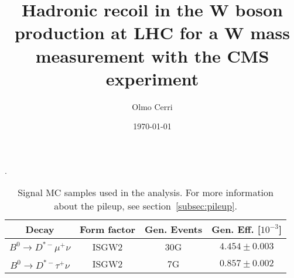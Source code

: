 \documentclass[a4paper,12pt,twoside]{book}
\title{Hadronic recoil in the W boson production at LHC for a W mass measurement with the CMS experiment}
\author{Olmo Cerri}
\affil{\href{https://www.df.unipi.it/}{Dipartimento di Fisica "E. Fermi" - Universit\`a di Pisa}}
\date{\today}
\begin{document}
\begin{table}[!ht]
\centering
\caption{Signal MC samples used in the analysis. For more information about the pileup, see section~\ref{subsec:pileup}.}.
\begin{tabular}{|c|c|c|c|}
 \hline
 Decay & Form factor & Gen. Events & Gen. Eff. [$10^{-3}$] \\
 \hline
 $B^0\to D^{*-}\mu^{+}\nu$ & ISGW2 & 30G & $4.454 \pm 0.003$ \\
 \hline
 $B^0 \to D^{*-}\tau^{+}\nu$ & ISGW2 & 7G & $0.857 \pm 0.002$ \\
 \hline
\end{tabular}
\label{table:SignalsSamplesMC}
\end{table}
\end{document}
